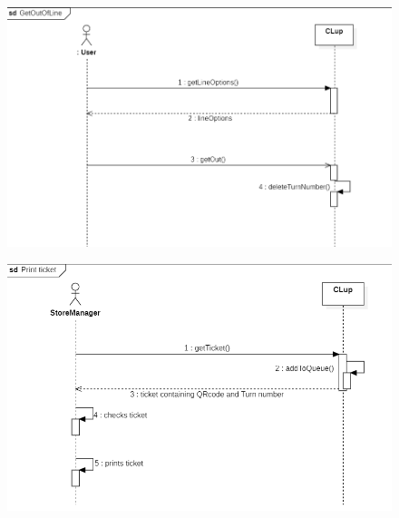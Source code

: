 \documentclass{article}
\begin{document}
\begin{figure}[H]
  \includegraphics[width=\linewidth]{OutOfLineSequence.png}
  
\end{figure}

\begin{figure}[H]
  \includegraphics[width=\linewidth]{PrintTicketSequence.png}
  
\end{figure}
\end{document}
